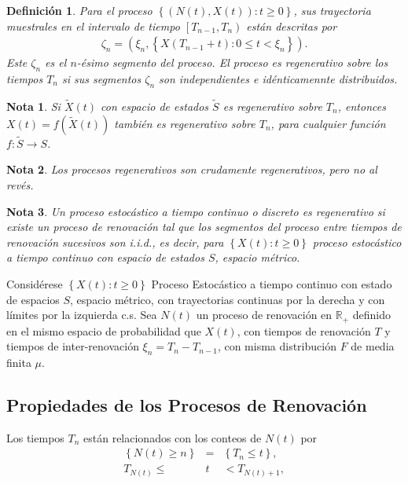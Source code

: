 \documentclass{article}
\newtheorem{Def}{Definición}[section]
\newtheorem{Note}{Nota}%
\newcommand{\rea}{\mathbb{R}}
\numberwithin{equation}{section}
\begin{document}
\begin{Def}
Para el proceso $\left\{\left(N\left(t\right),X\left(t\right)\right):t\geq0\right\}$, sus trayectoria muestrales en el intervalo de tiempo $\left[T_{n-1},T_{n}\right)$ est\'an descritas por
\begin{eqnarray*}
\zeta_{n}=\left(\xi_{n},\left\{X\left(T_{n-1}+t\right):0\leq t<\xi_{n}\right\}\right).
\end{eqnarray*}
Este $\zeta_{n}$ es el $n$-\'esimo segmento del proceso. El proceso es regenerativo sobre los tiempos $T_{n}$ si sus segmentos $\zeta_{n}$ son independientes e id\'enticamennte distribuidos.
\end{Def}


\begin{Note}
Si $\tilde{X}\left(t\right)$ con espacio de estados $\tilde{S}$ es regenerativo sobre $T_{n}$, entonces $X\left(t\right)=f\left(\tilde{X}\left(t\right)\right)$ tambi\'en es regenerativo sobre $T_{n}$, para cualquier funci\'on $f:\tilde{S}\rightarrow S$.
\end{Note}

\begin{Note}
Los procesos regenerativos son crudamente regenerativos, pero no al rev\'es.
\end{Note}


\begin{Note}
Un proceso estoc\'astico a tiempo continuo o discreto es regenerativo si existe un proceso de renovaci\'on  tal que los segmentos del proceso entre tiempos de renovaci\'on sucesivos son i.i.d., es decir, para $\left\{X\left(t\right):t\geq0\right\}$ proceso estoc\'astico a tiempo continuo con espacio de estados $S$, espacio m\'etrico.
\end{Note}

Consid\'erese $\left\{X\left(t\right):t\geq0\right\}$ Proceso Estoc\'astico a tiempo continuo con estado de espacios $S$, espacio m\'etrico, con trayectorias continuas por la derecha y con l\'imites por la izquierda c.s. Sea $N\left(t\right)$ un proceso de renovaci\'on en $\rea_{+}$ definido en el mismo espacio de probabilidad que $X\left(t\right)$, con tiempos de renovaci\'on $T$ y tiempos de inter-renovaci\'on $\xi_{n}=T_{n}-T_{n-1}$, con misma distribuci\'on $F$ de media finita $\mu$.



\subsection*{Propiedades de los Procesos de Renovaci\'on}
Los tiempos $T_{n}$ est\'an relacionados con los conteos de $N\left(t\right)$ por
\begin{eqnarray*}
\left\{N\left(t\right)\geq n\right\}&=&\left\{T_{n}\leq t\right\},\\
T_{N\left(t\right)}\leq &t&<T_{N\left(t\right)+1},
\end{eqnarray*}
\end{document}
